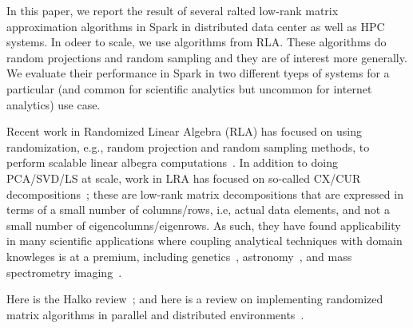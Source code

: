 In this paper, we report the result of several ralted low-rank matrix approximation algorithms in Spark in distributed data center as well as HPC systems.  
In odeer to scale, we use algorithms from RLA.
These algorithms do random projections and random sampling and they are of interest more generally.
We evaluate their performance in Spark in two different tyeps of systems for a particular (and common for scientific analytics but uncommon for internet analytics) use case.

Recent work in Randomized Linear Algebra (RLA) has focused on using randomization, e.g., random projection and random sampling methods, to perform scalable linear albegra computations~\cite{Mah-mat-rev_BOOK}.
In addition to doing PCA/SVD/LS at scale, work in LRA has focused on so-called CX/CUR decompositions~\cite{DMM08_CURtheory_JRNL,CUR_PNAS}; these are low-rank matrix decompositions that are expressed in terms of a small number of columns/rows, i.e, actual data elements, and not a small number of eigencolumns/eigenrows.
As such, they have found applicability in many scientific applications where coupling analytical techniques with domain knowleges is at a premium, including genetics~\cite{Paschou07b}, astronomy~\cite{Yip14-AJ}, and mass spectrometry imaging~\cite{YRPMB15}.

Here is the Halko review~\cite{HMT09_SIREV}; and here is a review on implementing randomized matrix algorithms in parallel and distributed environments~\cite{YMM15_TR}.



